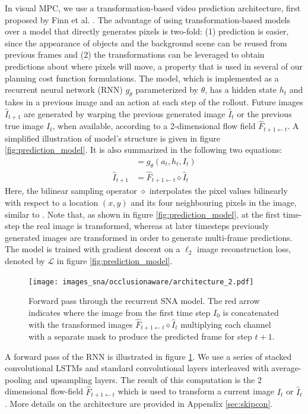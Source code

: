 In visual MPC, we use a transformation-based video prediction architecture, first proposed by Finn et al. \cite{finn_nips}. The advantage of using transformation-based models over a model that directly generates pixels is two-fold: (1) prediction is easier, since the appearance of objects and the background scene can be reused from previous frames and (2) the transformations can be leveraged to obtain predictions about where pixels will move, a property that is used in several of our planning cost function formulations. The model, which is implemented as a recurrent neural network (RNN) $g_{\theta}$ parameterized by $\theta$, has a hidden state $h_t$ and takes in a previous image and an action at each step of the rollout.  Future images $\hat{I}_{t+1}$ are generated by warping the previous generated image $\hat{I}_t$ or the previous true image $I_t$, when available, according to a 2-dimensional flow field $\hat{F}_{t+1 \leftarrow t}$. A simplified illustration of model's structure is given in figure \ref{fig:prediction_model}. It is also summarized in the following two equations:
\begin{align}
[h_{t+1}, \hat{F}_{t+1 \leftarrow t}] 	&= g_{\theta}(a_t, h_t, I_t) \\
\hat{I}_{t+1} 							&= \hat{F}_{t+1 \leftarrow t} \diamond  \hat{I}_t 
\label{simple_dna}
\end{align}
Here, the bilinear sampling operator $\diamond$ interpolates the pixel values bilinearly with respect to a location $(x,y)$ and its four neighbouring pixels in the image, similar to \cite{zhou2016view}. Note that, as shown in figure \ref{fig:prediction_model}, at the first time-step the real image is transformed, whereas at later timesteps previously generated images are transformed in order to generate multi-frame predictions. The model is trained with gradient descent on a $\ell_2$ image reconstruction loss, denoted by $\mathcal{L}$ in figure \ref{fig:prediction_model}.
\begin{figure}[t]
    \centering
    \texttt{[image: images\_sna/occlusionaware/architecture\_2.pdf]}
    \caption{\small{Forward pass through the recurrent SNA model. The red arrow indicates where the image from the first time step $I_0$ is concatenated with the transformed images $\hat{F}_{t+1 \leftarrow t} \diamond  \hat{I}_t $ multiplying each channel with a separate mask to produce the predicted frame for step $t+1$.}}      \label{fig:occlusion_model}
\end{figure}
A forward pass of the RNN is illustrated in figure \ref{fig:occlusion_model}. We use a series of stacked convolutional LSTMs and standard convolutional layers interleaved with average-pooling and upsampling layers. The result of this computation is the 2 dimensional flow-field $\hat{F}_{t+1 \leftarrow t}$ which is used to transform a current image $I_t$ or $\hat{I}_t$. More details on the architecture are provided in Appendix \ref{sec:skipcon}.

